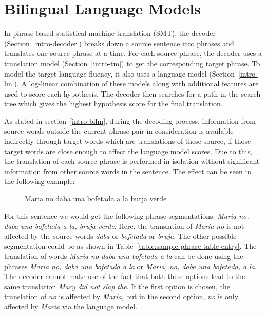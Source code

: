 
%
%

\chapter{Bilingual Language Models}
\label{two}

In phrase-based statistical machine translation (SMT), the decoder (Section~\ref{intro-decoder}) breaks down a source sentence into phrases and translates one source phrase at a time. For each source phrase, the decoder uses a translation model (Section~\ref{intro-tm}) to get the corresponding target phrase. To model the target language fluency, it also uses a language model (Section~\ref{intro-lm}). A log-linear combination of these models along with additional features are used to score each hypothesis. The decoder then searches for a path in the search tree which gives the highest hypothesis score for the final translation.

As stated in section~\ref{intro-bilm}, during the decoding process, information from source words outside the current phrase pair in consideration is available indirectly through target words which are translations of these source, if those target words are close enough to affect the language model scores. Due to this, the translation of each source phrase is performed in isolation without significant information from other source words in the sentence. The effect can be seen in the following example:

\begin{figure}[htbp]
	\begin{center}
		Maria no daba una bofetada a la burja verde
	\end{center}
\end{figure}

For this sentence we would get the following phrase segmentations: \textit{Maria no, daba una bofetada a la, bruja verde}. Here, the translation of \textit{Maria no} is not affected by the source words \textit{daba} or \textit{bofetada} or \textit{bruja}. The other possible segmentation could be as shown in Table~\ref{table:sample-phrase-table-entry}. The translation of words \textit{Maria no daba una bofetada a la} can be done using the phrases \textit{Maria no, daba una bofetada a la} or \textit{Maria, no, daba una bofetada, a la}. The decoder cannot make use of the fact that both these options lead to the same translation \textit{Mary did not slap the}. If the first option is chosen, the translation of \textit{no} is affected by \textit{Maria}, but in the second option, \textit{no} is only affected by \textit{Maria} via the language model.

